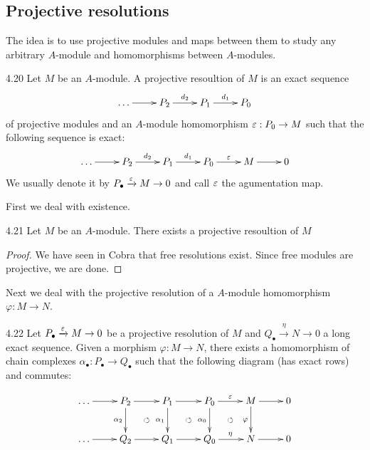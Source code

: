 \documentclass[twoside = false,	%
		headsepline,		%
		parskip = true,
		]{scrbook}						%
\begin{document}
\subsection{Projective resolutions}
    The idea is to use projective modules and maps between them to study any arbitrary $A$-module and homomorphisms  between $A$-modules.

    \begin{definition}{}{4.20}
        Let $M$ be an $A$-module. A projective resoultion of $M$ is an exact sequence
        \begin{equation*}
            \xymatrix{
                \dots \ar[r] & P_2 \ar[r]^{d_2} & P_1 \ar[r]^{d_1} & P_0 
            }
        \end{equation*}
        of projective modules and an $A$-module homomorphism $\varepsilon: P_0 \to M$ such that the following sequence is exact:
        \begin{equation*}
        \xymatrix {
            \dots \ar[r] & P_2 \ar[r]^{d_2} & P_1 \ar[r]^{d_1} & P_0 \ar[r]^{\e} & M \ar[r] & 0
        }
        \end{equation*}
        We usually denote it by $P_\bullet \xrightarrow{\varepsilon} M \to 0$ and call $\varepsilon$ the agumentation map.
    \end{definition}

    First we deal with existence.

    \begin{lemma}{}{4.21}
        Let $M$ be an $A$-module. There exists a projective resoultion of $M$
    \end{lemma}

    \begin{proof}
        We have seen in Cobra \cite{Cobra} that free resolutions exist. Since free modules are projective, we are done.
    \end{proof}

    Next we deal with the projective resolution of a $A$-module homomorphism $\varphi: M \to N$.

    \begin{proposition}{}{4.22}
        Let $P_\bullet \xrightarrow{\varepsilon} M \to 0$ be a projective resolution of $M$ and $Q_\bullet \xrightarrow{\eta} N \to 0$ a long exact sequence. Given a morphism $\varphi: M \to N$, there exists a homomorphism of chain complexes $\alpha_\bullet: P_\bullet \to Q_\bullet$ such that the following diagram (has exact rows) and commutes:

        \begin{equation*}
            \xymatrix {
                \dots \ar[r] & P_2 \ar[r] \ar[d]_{\alpha_2} & P_1 \ar[r] \ar[d]_{\alpha_1} & P_0 \ar[r]^{\e} \ar[d]_{\alpha_0}& M \ar[r] \ar[d]_{\varphi} & 0 \\
                \dots \ar[r] & Q_2 \ar[r] \ar@{}[ur]|{\circlearrowleft} & Q_1 \ar[r] \ar@{}[ur]|{\circlearrowleft} & Q_0 \ar[r]^{\eta} \ar@{}[ur]|{\circlearrowleft} & N \ar[r] & 0
            }
        \end{equation*}
    \end{proposition}
\end{document}
